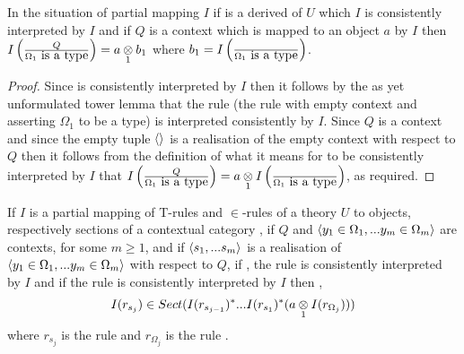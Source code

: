 \begin{lemma}
In the situation of  partial mapping $I$ 
if \ZOmega is a derived of $U$  which $I$  is consistently interpreted by $I$ 
and if $Q$ is a context which is mapped to an object $a$ by $I$ 
then $\Imappedrule{Q}{\isT{\Omega_1}}=\crossx{a}{b_1}{1}$ where $b_1=\Imappedrule{}{\isT{\Omega_1}}$.
\end{lemma}
\begin{proof}
Since \ZOmega is consistently interpreted by $I$ then it follows by the as yet unformulated tower lemma that the rule 
\gatdisplayrule{}{\isT{\Omega}} (the rule with empty context and asserting $\Omega_1$ to be a type) is interpreted consistently
by $I$. Since $Q$ is a context and since the empty tuple $\tuple{}$ is a realisation of the empty context with respect to $Q$ then it follows from the definition of what it means for  \gatdisplayrule{}{\isT{\Omega}} to be consistently interpreted by $I$ that
$\Imappedrule{Q}{\isT{\Omega_1}}=\crossx{a}{\Imappedrule{}{\isT{\Omega_1}}}{1}$, as required.
\end{proof}
\begin{lemma}
\newcommand {\forceSOURCEwidth}{\rule{5cm}{0pt}}  %
\newcommand {\forceTARGETwidth}{\rule{2.2cm}{0pt}}
If $I$ is a partial mapping of T-rules and $\in$-rules of a theory $U$ to objects, respectively sections of a contextual category \catcw,
 if $Q$  and $\encyOmega{m}$ are contexts, for some $m \geq 1$,  and if $\tuple{\sm}$ is a realisation of $\tuple{\yOmega{m}}$ with respect to $Q$,
 if \foreachj, the rule  is consistently interpreted by $I$ 
 and if the rule  is consistently interpreted by $I$
then \foreachj,  $$I(r_{s_j}) \in Sect(I(r_{s_{j-1}})^*...I(r_{s_1})^*(\crossx{a}{I(r_{\Omega_j})}{1}))$$
 where $r_{s_j}$ is the rule  and $r_{\Omega_j}$ is the rule .
\end{lemma}

